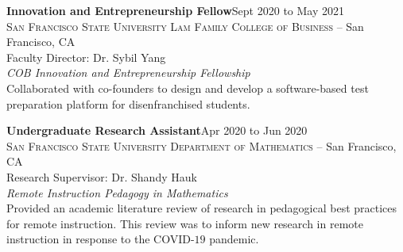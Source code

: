 \documentclass[hidelinks, 10pt]{article}
\def\contentspacing{2.5mm}          %
\begin{document}
{\vspace{\contentspacing}

\begin{minipage}[ct]{0.9\linewidth}
    \textbf{Innovation and Entrepreneurship Fellow}\hfill Sept 2020 to May 2021\\
    \textsc{San Francisco State University Lam Family College of Business} -- San Francisco, CA\\
    Faculty Director: Dr. Sybil Yang\vspace{1mm}\\
    {\textit{COB Innovation and Entrepreneurship Fellowship}}\\
    Collaborated with co-founders to design and develop a software-based test
    preparation platform for disenfranchised students.
\end{minipage}

\vspace{\contentspacing}\vspace{1mm}

\begin{minipage}[ct]{0.9\linewidth}
    \textbf{Undergraduate Research Assistant}\hfill Apr 2020 to Jun 2020\\
    \textsc{San Francisco State University Department of Mathematics} -- San Francisco, CA\\
    Research Supervisor: Dr. Shandy Hauk\vspace{1mm}\\
    {\textit{Remote Instruction Pedagogy in Mathematics}}\\
    Provided an academic literature review of research in pedagogical best practices
    for remote instruction.  This review was to inform new research in remote
    instruction in response to the COVID-$19$ pandemic.
\end{minipage}

}
\end{document}
